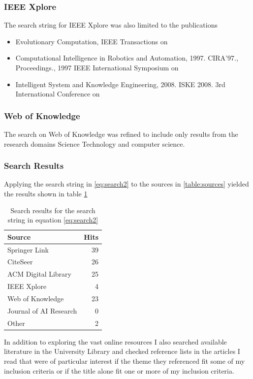 \documentclass[a4paper]{book}
\begin{document}
\begin{appendices}
				\subsubsection{IEEE Xplore}
				The search string for IEEE Xplore was also limited to the publications

				\begin{itemize}
				\item{ Evolutionary Computation, IEEE Transactions on}
				\item{Computational Intelligence in Robotics and Automation, 1997. CIRA'97., Proceedings., 1997 IEEE International Symposium on}
				\item{Intelligent System and Knowledge Engineering, 2008. ISKE 2008. 3rd International Conference on}
				\end{itemize}

				\subsubsection{Web of Knowledge} The search on Web of Knowledge was refined to include only results from the research domains Science Technology and computer science.

				\subsubsection{Search Results}

				Applying the search string in \ref{eq:search2} to the sources in \ref{table:sources} yielded the results shown in table \ref{table:SearchResults}
				\begin{table}[htdp]
				\begin{center}
				\begin{tabular}{|l|r|}
				\hline
				Source				& Hits 	\\ \hline
				Springer Link 			& 39 	\\ \hline
				CiteSeer    			& 26 \\ \hline
				ACM Digital Library 		& 25 \\ \hline
				IEEE Xplore 			& 4  \\ \hline
				Web of Knowledge 		& 23 \\ \hline
				Journal of AI Research 		& 0 	\\ \hline
				Other  				& 2 \\\hline\hline
				\end{tabular}
				\end{center}
				\label{table:SearchResults}
				\caption{Search results for the search string in equation \ref{eq:search2}}
				\end{table}
				In addition to exploring the vast online resources I also searched available literature in the University Library and checked reference lists in the articles I read that were of particular interest if the theme they referenced fit some of my inclusion criteria or if the title alone fit one or more of my inclusion criteria.


\end{appendices}
\end{document}
